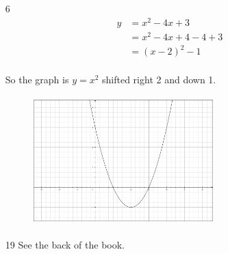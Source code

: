 \documentclass[fleqn,addpoints]{exam}
\begin{document}
\begin{itemize}
\item[6]
\begin{align*}
  y &= x^2 - 4x + 3 \\
    &= x^2 - 4x + 4 - 4 + 3 \\
    &= (x - 2)^2 - 1 \\
\end{align*}

So the graph is $y=x^2$ shifted right 2 and down 1.

\begin{figure}[H]
  \includegraphics[width=7cm,height=5cm]{1.8-6.eps}
\end{figure}

\item[19]
See the back of the book.







\end{itemize}
\end{document}
